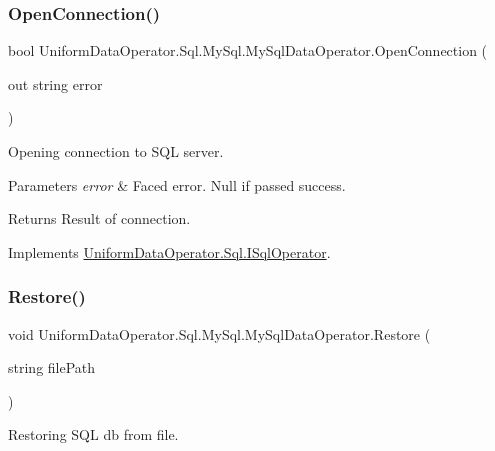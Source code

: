 \subsubsection{\texorpdfstring{Open\+Connection()}{OpenConnection()}}
{\footnotesize\ttfamily bool Uniform\+Data\+Operator.\+Sql.\+My\+Sql.\+My\+Sql\+Data\+Operator.\+Open\+Connection (\begin{DoxyParamCaption}\item[{out string}]{error }\end{DoxyParamCaption})}



Opening connection to S\+QL server. 


\begin{DoxyParams}{Parameters}
{\em error} & Faced error. Null if passed success.\\
\hline
\end{DoxyParams}
\begin{DoxyReturn}{Returns}
Result of connection.
\end{DoxyReturn}


Implements \mbox{\hyperlink{interface_uniform_data_operator_1_1_sql_1_1_i_sql_operator_a6fc9e5efd1e21ae9998b9c56ae9e347c}{Uniform\+Data\+Operator.\+Sql.\+I\+Sql\+Operator}}.

\mbox{\label{class_uniform_data_operator_1_1_sql_1_1_my_sql_1_1_my_sql_data_operator_a22a9e92989ebdb3a52b8ebe409c59831}} 
\subsubsection{\texorpdfstring{Restore()}{Restore()}}
{\footnotesize\ttfamily void Uniform\+Data\+Operator.\+Sql.\+My\+Sql.\+My\+Sql\+Data\+Operator.\+Restore (\begin{DoxyParamCaption}\item[{string}]{file\+Path }\end{DoxyParamCaption})}



Restoring S\+QL db from file. 


